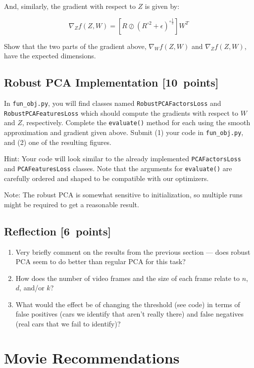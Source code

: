 \documentclass{article}
\newcommand{\blu}[1]{{\textcolor{blu}{#1}}}
\let\ask\blu
\newcommand\pts[1]{\textcolor{pointscolour}{[#1~points]}}
\begin{document}
And, similarly, the gradient with respect to $Z$ is given by:

\[
\nabla_Z f(Z,W) = \left[ R \oslash \left(R^{\circ 2} + \epsilon\right)^{\circ \frac12} \right] W^T
\]

\ask{Show that the two parts of the gradient above, $\nabla_W f(Z,W)$ and $\nabla_Z f(Z,W)$, have the expected dimensions.}


\subsection{Robust PCA Implementation \pts{10}}

In \texttt{fun\_obj.py}, you will find classes named \texttt{RobustPCAFactorsLoss} and \texttt{RobustPCAFeaturesLoss} which should compute the gradients with respect to $W$ and $Z$, respectively. \ask{Complete the \texttt{evaluate()} method for each using the smooth approximation and gradient given above. Submit (1) your code in \texttt{fun\_obj.py}, and (2) one of the resulting figures.}

Hint: Your code will look similar to the already implemented \texttt{PCAFactorsLoss} and \texttt{PCAFeaturesLoss} classes. Note that the arguments for \texttt{evaluate()} are carefully ordered and shaped to be compatible with our optimizers.

Note: The robust PCA is somewhat sensitive to initialization, so multiple runs might be required to get a reasonable result.

\subsection{Reflection \pts{6}}

\begin{enumerate}
	\item Very briefly comment on the results from the previous section --- does robust PCA seem to do better than regular PCA for this task?
	\item How does the number of video frames and the size of each frame relate to $n$, $d$, and/or $k$?
	\item What would the effect be of changing the threshold (see code) in terms of false positives (cars we identify that aren't really there) and false negatives (real cars that we fail to identify)?
\end{enumerate}


\section{Movie Recommendations}
\end{document}

